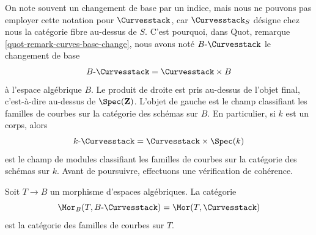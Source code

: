 \medskip\noindent
On note souvent un changement de base par un indice, mais nous ne pouvons pas
employer cette notation pour $\Curvesstack$, car $\Curvesstack_S$
désigne chez nous la catégorie fibre au-dessus de $S$.
C'est pourquoi, dans Quot, remarque \ref{quot-remark-curves-base-change},
nous avons noté $B\text{-}\Curvesstack$ le changement de base
$$
B\text{-}\Curvesstack = \Curvesstack \times B
$$
à l'espace algébrique $B$. Le produit de droite est pris au-dessus de
l'objet final, c'est-à-dire au-dessus de $\Spec(\mathbf{Z})$. L'objet de gauche
est le champ classifiant les familles de courbes sur la catégorie des schémas
sur $B$. En particulier, si $k$ est un corps, alors
$$
k\text{-}\Curvesstack = \Curvesstack \times \Spec(k)
$$
est le champ de modules classifiant les familles de courbes sur la catégorie
des schémas sur $k$.
Avant de poursuivre, effectuons une vérification de cohérence.

\begin{lemma}
\label{lemma-extend-curves-to-spaces}
Soit $T \to B$ un morphisme d'espaces algébriques. La catégorie
$$
\Mor_B(T, B\text{-}\Curvesstack) = \Mor(T, \Curvesstack)
$$
est la catégorie des familles de courbes sur $T$.
\end{lemma}

